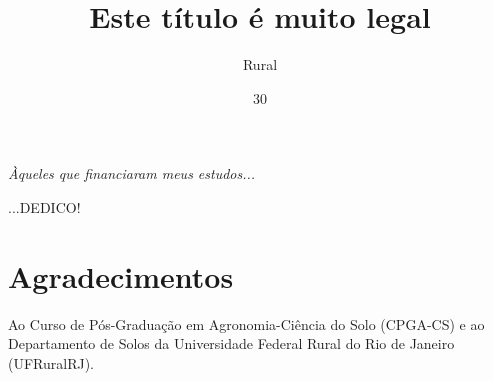 \documentclass[tese]{UFRuralRJ}
\title{Este título é muito legal}                              %
\author{Rural}{Nome do Melhor Estudante da}                    %
\date{30}{Fevereiro}{2016}                                             %
\begin{document}
\maketitle


\makeapprove


\clearpage\mbox{}\vfill\hspace{80mm}
\begin{minipage}{76mm}
  \begin{flushright}
    {\em
    Àqueles que financiaram meus estudos...
    \par
    ...DEDICO!
    }
  \end{flushright}
\end{minipage}


\chapter*{Agradecimentos}

Ao Curso de Pós-Graduação em Agronomia-Ciência do Solo (CPGA-CS) e ao 
Departamento de Solos da Universidade Federal Rural do Rio de Janeiro 
(UFRuralRJ).
\end{document}
